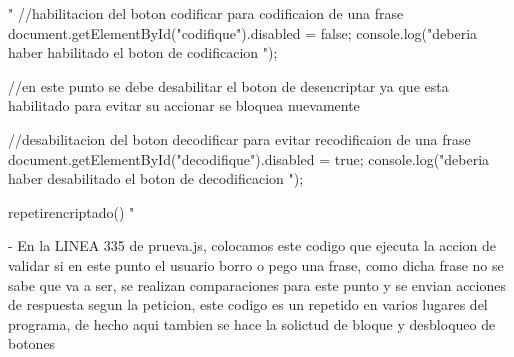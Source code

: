             
                    "  //habilitacion del boton codificar para codificaion de una frase 
                        document.getElementById("codifique").disabled = false;
                        console.log("deberia haber habilitado el boton de codificacion ");

                        //en este punto se debe desabilitar el boton de desencriptar ya que esta habilitado para evitar su accionar se bloquea nuevamente
                        
                        //desabilitacion del boton decodificar para evitar recodificaion de una frase 
                        document.getElementById("decodifique").disabled = true;
                        console.log("deberia haber desabilitado el boton de decodificacion ");  

                        repetirencriptado()  "

        
            - En la LINEA 335 de prueva.js, colocamos este codigo que ejecuta la accion de validar si en este punto el usuario borro o pego una frase, como dicha frase 
             no se sabe que va a ser, se realizan comparaciones para este punto y se envian acciones de respuesta segun la peticion, este codigo es un repetido en varios 
             lugares del programa, de hecho aqui tambien se hace la solictud de bloque y desbloqueo de botones 


